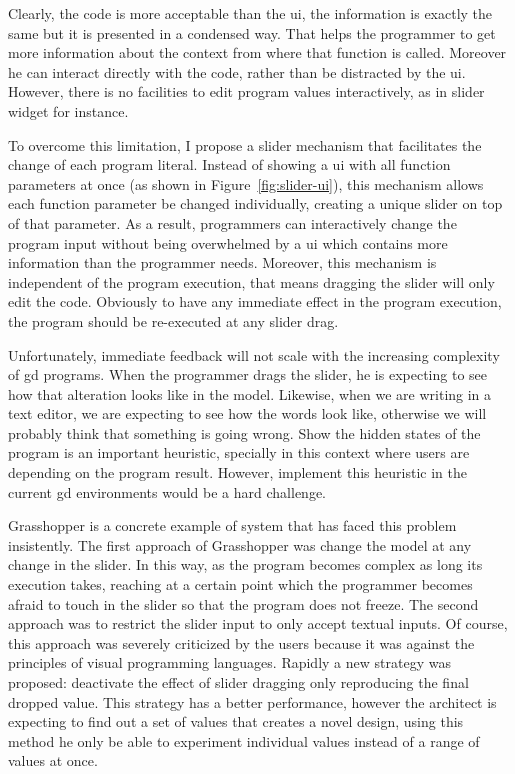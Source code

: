{\centering
  \par
}

Clearly, the code is more acceptable than the \gls{ui}, the information is exactly the same but it is presented in a condensed way. That helps the programmer to get more information about the context from where that function is called. Moreover he can interact directly with the code, rather than be distracted by the \gls{ui}. However, there is no facilities to edit program values interactively, as in slider widget for instance.

To overcome this limitation, I propose a slider mechanism that facilitates the change of each program literal. Instead of showing a \gls{ui} with all function parameters at once (as shown in Figure~\ref{fig:slider-ui}), this mechanism allows each function parameter be changed individually, creating a unique slider on top of that parameter. As a result, programmers can interactively change the program input without being overwhelmed by a \gls{ui} which contains more information than the programmer needs. Moreover, this mechanism is independent of the program execution, that means dragging the slider will only edit the code. Obviously to have any immediate  effect in the program execution, the program should be re-executed at any slider drag.

Unfortunately, immediate feedback will not scale with the increasing complexity of \gls{gd} programs. When the programmer drags the slider, he is expecting to see how that alteration looks like in the model. Likewise, when we are writing in a text editor, we are expecting to see how the words look like, otherwise we will probably think that something is going wrong. Show the hidden states of the program is an important heuristic, specially in this context where users are depending on the program result. However, implement this heuristic in the current \gls{gd} environments would be a hard challenge.

Grasshopper is a concrete example of system that has faced this problem insistently. The first approach of Grasshopper was change the model at any change in the slider. In this way, as the program becomes complex as long its execution takes, reaching at a certain point which the programmer becomes afraid to touch in the slider so that the program does not freeze. The second approach was to restrict the slider input to only accept textual inputs. Of course, this approach was severely criticized by the users because it was against the principles of visual programming languages. Rapidly a new strategy was proposed: deactivate the effect of slider dragging only reproducing the final dropped value. This strategy has a better performance, however the architect is expecting to find out a set of values that creates a novel design, using this method he only be able to experiment individual values instead of a range of values at once.


